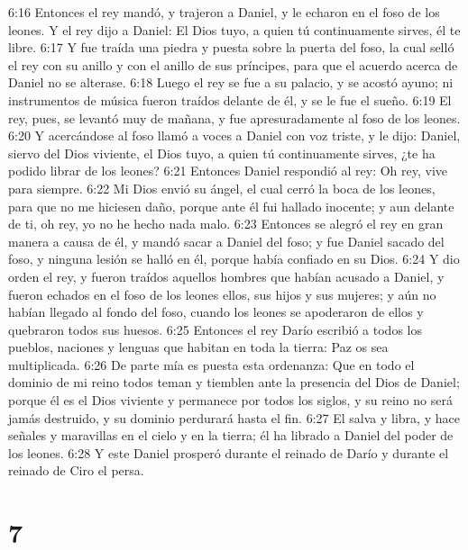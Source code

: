 6:16 Entonces el rey mandó, y trajeron a Daniel, y le echaron en el foso de los leones. Y el rey dijo a Daniel: El Dios tuyo, a quien tú continuamente sirves, él te libre.  
6:17 Y fue traída una piedra y puesta sobre la puerta del foso, la cual selló el rey con su anillo y con el anillo de sus príncipes, para que el acuerdo acerca de Daniel no se alterase.  
6:18 Luego el rey se fue a su palacio, y se acostó ayuno; ni instrumentos de música fueron traídos delante de él, y se le fue el sueño.  
6:19 El rey, pues, se levantó muy de mañana, y fue apresuradamente al foso de los leones.  
6:20 Y acercándose al foso llamó a voces a Daniel con voz triste, y le dijo: Daniel, siervo del Dios viviente, el Dios tuyo, a quien tú continuamente sirves, ¿te ha podido librar de los leones?  
6:21 Entonces Daniel respondió al rey: Oh rey, vive para siempre.  
6:22 Mi Dios envió su ángel, el cual cerró la boca de los leones, para que no me hiciesen daño, porque ante él fui hallado inocente; y aun delante de ti, oh rey, yo no he hecho nada malo.  
6:23 Entonces se alegró el rey en gran manera a causa de él, y mandó sacar a Daniel del foso; y fue Daniel sacado del foso, y ninguna lesión se halló en él, porque había confiado en su Dios.  
6:24 Y dio orden el rey, y fueron traídos aquellos hombres que habían acusado a Daniel, y fueron echados en el foso de los leones ellos, sus hijos y sus mujeres; y aún no habían llegado al fondo del foso, cuando los leones se apoderaron de ellos y quebraron todos sus huesos.  
6:25 Entonces el rey Darío escribió a todos los pueblos, naciones y lenguas que habitan en toda la tierra: Paz os sea multiplicada.  
6:26 De parte mía es puesta esta ordenanza: Que en todo el dominio de mi reino todos teman y tiemblen ante la presencia del Dios de Daniel; porque él es el Dios viviente y permanece por todos los siglos, y su reino no será jamás destruido, y su dominio perdurará hasta el fin.  
6:27 El salva y libra, y hace señales y maravillas en el cielo y en la tierra; él ha librado a Daniel del poder de los leones.  
6:28 Y este Daniel prosperó durante el reinado de Darío y durante el reinado de Ciro el persa.  

\chapter{7}

